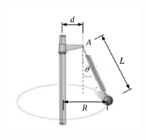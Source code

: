 \documentclass[letterpaper,11pt]{article}
\begin{document}
\begin{enumerate}
\begin{figure}[H]
    \centering
    \includegraphics[width = 0.4\textwidth]{2023-1/img/aux_8/Aux 8 - P3.PNG}
\end{figure}

%   
\end{enumerate}
\end{document}
